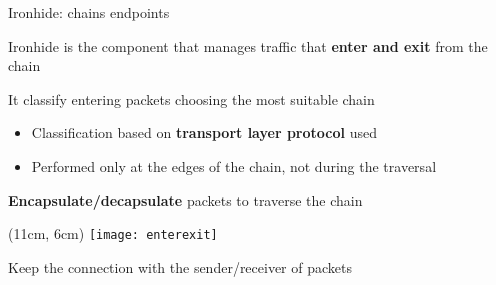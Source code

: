 \begin{frame}{Ironhide: chains endpoints}

  Ironhide is the component that manages traffic that \textbf{enter and exit}
  from the chain

  \vfill{}

  It classify entering packets choosing the most suitable chain
  \begin{itemize}
    \item Classification based on \textbf{transport layer protocol} used
    \item Performed only at the edges of the chain, not during the traversal
  \end{itemize}

  \vfill{}

  \textbf{Encapsulate/decapsulate} packets to traverse the chain

  \begin{textblock*}{1cm}(11cm, 6cm)
    \texttt{[image: enterexit]}
  \end{textblock*}

  \vfill{}

  Keep the connection with the sender/receiver of packets

\end{frame}